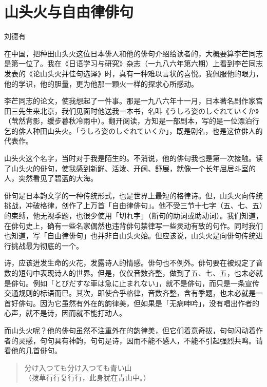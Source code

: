 \chapter{\FK 山头火与自由律俳句}
{\FS

\hfill 刘德有

\bigskip

在中国，把种田山头火这位日本俳人和他的俳句介绍给读者的，大概要算李芒同志是第一位了。我在《日语学习与研究》杂志（一九八六年第六期）上看到李芒同志发表的《论山头火并佳句选译》时，真有一种难以言状的喜悦。我佩服他的眼力，他的学识，他的胆量，更为他那一颗火一样的探求心所感动。

李芒同志的论文，使我想起了一件事。那是一九八六年十一月，日本著名剧作家宫田三先生来北京，我们见面时他送我一本书，名叫《{\FM うしろ姿のしぐれていくか}》（茕然背影，缓步暮秋冷雨中\footnotemark[1]）。翻开阅读，方知是一部剧本，写的是一位漂泊行乞的俳人种田山头火。「{\FM うしろ姿のしぐれていくか}」，既是剧名，也是这位俳人的代表作。


山头火这个名字，当时对于我是陌生的。不消说，他的俳句我也是第一次接触。读了山头火的俳句，使我感到新鲜、活泼、开阔、舒展，就像一个长年屈居斗室的人，突然看见了碧蓝的大海。

俳句是日本韵文学的一种传统形式，也是世界上最短的格律诗。但，山头火向传统挑战，冲破格律，创作了上万首「自由律俳句」。他不受三节十七字（五、七、五）的束缚，他无视季题，也很少使用「切れ字」（断句的助词或助动词）。我们知道，在俳句史上，确有一些名家偶然也违背俳句禁律写一些灵动有致的句作。同时我们也知道，写「自由律俳句」也并非自山头火始。但应该说，山头火是向俳句传统进行挑战最为彻底的一个。

诗，应该迸发生命的火花，发露诗人的情感。俳句也不例外。俳句要在被规定了音数的短句中表现诗人的世界。但是，仅仅音数齐整，做到了五、七、五，也未必就是俳句。例如「{\FM とびだすな車は急に止まれない}」，就不是俳句，而只是一条宣传交通规则的标语而巳。其次，即使合乎格律，音数齐整，含有季题，也未必就是一首好俳句。因为它虽然有外在的韵律美，但如果是「无病呻吟」，没有唱出作者的心声，就不是诗，因而就不能打动人。

而山头火呢？他的俳句虽然不注重外在的韵律美，但它们着意奇拔，句句闪动着作者的灵感，句句具有神韵，句句是诗，因而不能不感人，不能不引起强烈共鸣。请看他的几首俳句。
\begin{quote}
    {\FM 分け入つても分け入つても青い山}\\
    （拨草行行复行行，此身犹在青山中。）


\end{quote}}
